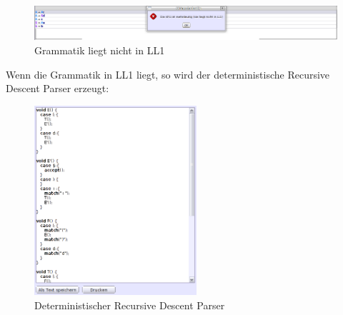 \begin{figure}[h]
  \begin{center}
    \includegraphics[scale=0.25]{../images/cfgnotll1.png}
    \caption{Grammatik liegt nicht in LL1}
  \end{center}
\end{figure}

\newpage
Wenn die Grammatik in LL1 liegt, so wird der deterministische Recursive Descent Parser erzeugt:

\begin{figure}[h]
  \begin{center}
    \includegraphics[width=6cm]{../images/deterministicrdp.png}
    \caption{Deterministischer Recursive Descent Parser}
  \end{center}
\end{figure}

